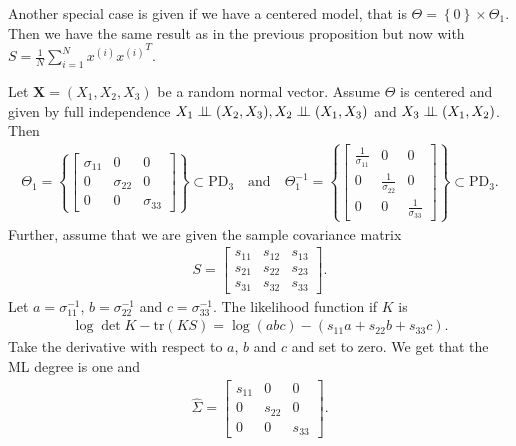 \begin{prop}
  Another special case is given if we have a centered model, that is \( \Theta = \left\{ 0 \right\} \times \Theta_1 \). Then we have the same result as in the previous proposition but now with \( S = \frac{1}{N} \sum^N_{i=1}x^{(i)}{x^{(i)}}^T \).
\end{prop}

\begin{eg}
  Let \( \mathbf X = (X_1, X_2, X_3) \) be a random normal vector.
  Assume \( \Theta \) is centered and given by full independence \( X_1 \perp \!\!\! \perp (X_2, X_3), X_2 \perp \!\!\! \perp (X_1,X_3) \) and \( X_3 \perp \!\!\! \perp (X_1,X_2) \). Then 
  \begin{align*}
    \Theta_1 = \left\{ \begin{bmatrix}
        \sigma_{11} & 0 & 0 \\
        0 & \sigma_{22} & 0 \\
        0 & 0 & \sigma_{33}
    \end{bmatrix}\right\} \subset \mathrm{PD}_3 \quad \text{and} \quad \Theta_1^{-1} = \left\{ 
    \begin{bmatrix}
      \frac{1}{\sigma_{11}} & 0 & 0 \\
      0 & \frac{1}{\sigma_{22}} & 0 \\
      0 & 0 & \frac{1}{\sigma_{33}}
    \end{bmatrix}
     \right\}  \subset \mathrm{PD}_3.
  \end{align*}
  Further, assume that we are given the sample covariance matrix
  \begin{align*}
    S = \begin{bmatrix}
      s_{11} & s_{12} & s_{13} \\
      s_{21} & s_{22} & s_{23} \\
      s_{31} & s_{32} & s_{33}
    \end{bmatrix}.
  \end{align*}
  Let \( a = \sigma_{11}^{-1} \), \( b = \sigma_{22}^{-1} \) and \( c = \sigma_{33}^{-1} \).
  The likelihood function if \( K \) is
  \begin{align*}
    \log \det K - \mathrm{tr}(KS) = \log(abc) - (s_{11}a + s_{22}b + s_{33}c ).
  \end{align*}
  Take the derivative with respect to \( a \), \( b \) and \( c \) and set to zero. We get that the ML degree is one and 
  \begin{align*}
    \hat \Sigma = \begin{bmatrix}
      s_{11} & 0 & 0 \\
      0 & s_{22} & 0 \\
      0 & 0 & s_{33}
    \end{bmatrix}.
  \end{align*}
\end{eg}

